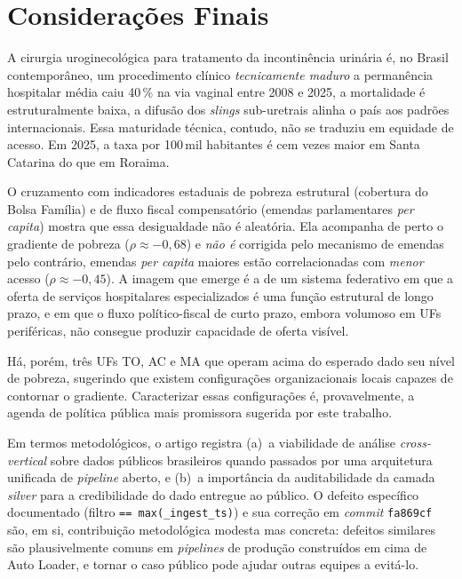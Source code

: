 \documentclass[12pt,a4paper,oneside]{article}
\begin{document}
\section{Considerações Finais}\label{sec:conclusao}

A cirurgia uroginecológica para tratamento da incontinência
urinária é, no Brasil contemporâneo, um procedimento clínico
\textit{tecnicamente maduro} \textemdash{} a permanência
hospitalar média caiu 40\,\% na via vaginal entre 2008 e 2025,
a mortalidade é estruturalmente baixa, a difusão dos
\textit{slings} sub-uretrais alinha o país aos padrões
internacionais. Essa maturidade técnica, contudo, não se
traduziu em equidade de acesso. Em 2025, a taxa por 100\,mil
habitantes é cem vezes maior em Santa Catarina do que em
Roraima.

O cruzamento com indicadores estaduais de pobreza estrutural
(cobertura do Bolsa Família) e de fluxo fiscal compensatório
(emendas parlamentares \textit{per capita}) mostra que essa
desigualdade não é aleatória. Ela acompanha de perto o
gradiente de pobreza ($\rho \approx -0{,}68$) e \textit{não é}
corrigida pelo mecanismo de emendas \textemdash{} pelo
contrário, emendas \textit{per capita} maiores estão
correlacionadas com \textit{menor} acesso ($\rho \approx -0{,}45$).
A imagem que emerge é a de um sistema federativo em que a
oferta de serviços hospitalares especializados é uma função
estrutural de longo prazo, e em que o fluxo político-fiscal de
curto prazo, embora volumoso em UFs periféricas, não consegue
produzir capacidade de oferta visível.

Há, porém, três UFs \textemdash{} TO, AC e MA \textemdash{} que
operam acima do esperado dado seu nível de pobreza, sugerindo
que existem configurações organizacionais locais capazes de
contornar o gradiente. Caracterizar essas configurações é,
provavelmente, a agenda de política pública mais promissora
sugerida por este trabalho.

Em termos metodológicos, o artigo registra (a)~a viabilidade de
análise \textit{cross-vertical} sobre dados públicos brasileiros
quando passados por uma arquitetura unificada de \textit{pipeline}
aberto, e (b)~a importância da auditabilidade da camada
\textit{silver} para a credibilidade do dado entregue ao público.
O defeito específico documentado (filtro
\texttt{== max(\_ingest\_ts)}) e sua correção em \textit{commit}
\texttt{fa869cf} são, em si, contribuição metodológica modesta
mas concreta: defeitos similares são plausivelmente comuns em
\textit{pipelines} de produção construídos em cima de Auto Loader,
e tornar o caso público pode ajudar outras equipes a evitá-lo.
\end{document}
